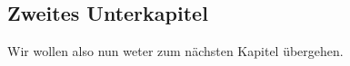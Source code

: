 \subsection{Zweites Unterkapitel}
Wir wollen also nun weter zum nächsten Kapitel übergehen.












 